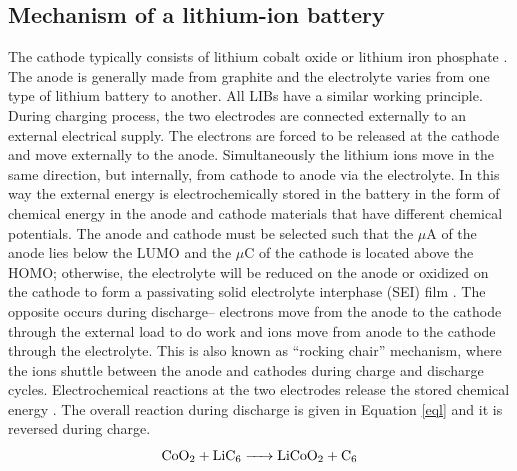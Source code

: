 \subsection*{Mechanism of a lithium-ion battery}
The cathode typically consists of lithium cobalt oxide  or lithium iron phosphate . The anode is generally made from graphite and the electrolyte varies from one type of lithium battery to another. All LIBs have a similar working principle. During charging process, the two electrodes are connected externally to an external electrical supply. The electrons are forced to be released at the cathode and move externally to the anode. Simultaneously the lithium ions move in the same direction, but internally, from cathode to anode via the electrolyte. In this way the external energy is electrochemically stored in the battery in the form of chemical energy in the anode and cathode materials that have different chemical potentials. The anode and cathode must be selected such that the $\mu$A of the anode lies below the LUMO and the $\mu$C of the cathode is located above the HOMO; otherwise, the electrolyte will be reduced on the anode or oxidized on the cathode to form a passivating solid electrolyte interphase (SEI) film \cite{goodenough_challenges_2010}. The opposite occurs during discharge-- electrons move from the anode to the cathode through the external load to do work and  ions move from anode to the cathode through the electrolyte. This is also known as \enquote{rocking chair} mechanism, where the  ions shuttle between the anode and cathodes during charge and discharge cycles. Electrochemical reactions at the two electrodes release the stored chemical energy \cite{deng_li-ion_2015}. The overall reaction during discharge is given in Equation \ref{eql} and it is reversed during charge. 
\begin{equation}\label{eql}
    \ce{CoO2 + LiC6 -> LiCoO2 + C6}
\end{equation}

